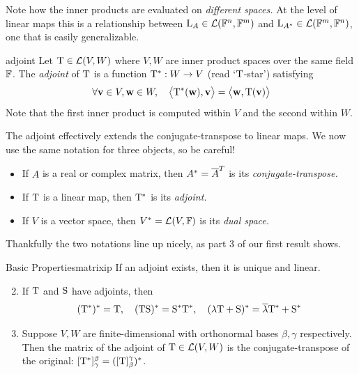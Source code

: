 Note how the inner products are evaluated on \emph{different spaces.} At the level of linear maps this is a relationship between $\mathrm{L}_A\in\mathcal{L}(\mathbb{F}^n,\mathbb{F}^m)$ and $\mathrm{L}_{A^*}\in\mathcal{L}(\mathbb{F}^m,\mathbb{F}^n)$, one that is easily generalizable.

\begin{defn}{}{adjoint}
	Let $\mathrm{T}\in\mathcal{L}(V,W)$ where $V,W$ are inner product spaces over the same field $\mathbb{F}$. The \emph{adjoint} of $\mathrm{T}$ is a function $\mathrm{T}^*:W\to V$ (read `$\mathrm{T}$-star') satisfying
	\[
		\forall {\mathbf{v}}\in V,{\mathbf{w}}\in W,\quad \big\langle\mathrm{T}^*({\mathbf{w}}),{\mathbf{v}}\big\rangle=\big\langle{\mathbf{w}},\mathrm{T}({\mathbf{v}})\big\rangle
	\]
	Note that the first inner product is computed within $V$ and the second within $W$.
\end{defn}

The adjoint effectively extends the conjugate-transpose to linear maps. We now use the same notation for three objects, so be careful!
\begin{itemize}
  \item If $A$ is a real or complex matrix, then $A^*=\overline{A}^T$ is its \emph{conjugate-transpose.}
  \item If $\mathrm{T}$ is a linear map, then $\mathrm{T}^*$ is its \emph{adjoint.}
  \item If $V$ is a vector space, then $V^*=\mathcal{L}(V,\mathbb{F})$ is its \emph{dual space.}
\end{itemize}
Thankfully the two notations line up nicely, as part 3 of our first result shows.

\begin{thm}{Basic Properties}{matrixip}
	\exstart If an adjoint exists,\footnotemark{} then it is unique and linear.
	\begin{enumerate}\setcounter{enumi}{1}
	  \item If $\mathrm{T}$ and $\mathrm{S}$ have adjoints, then
	  \[
	  	(\mathrm{T}^*)^*=\mathrm{T},\quad 
	  	(\mathrm{T}\mathrm{S})^*=\mathrm{S}^*\mathrm{T}^*,\quad
	  	(\lambda\mathrm{T}+\mathrm{S})^*=\overline{\lambda}\mathrm{T}^*+\mathrm{S}^*
	  \]
	  \item Suppose $V,W$ are finite-dimensional with orthonormal bases $\beta,\gamma$ respectively. Then the matrix of the adjoint of $\mathrm{T}\in\mathcal{L}(V,W)$ is the conjugate-transpose of the original: $[\mathrm{T}^*]_\gamma^\beta =([\mathrm{T}]_\beta^\gamma)^*$.
	\end{enumerate}
\end{thm}


\pagebreak[3]


